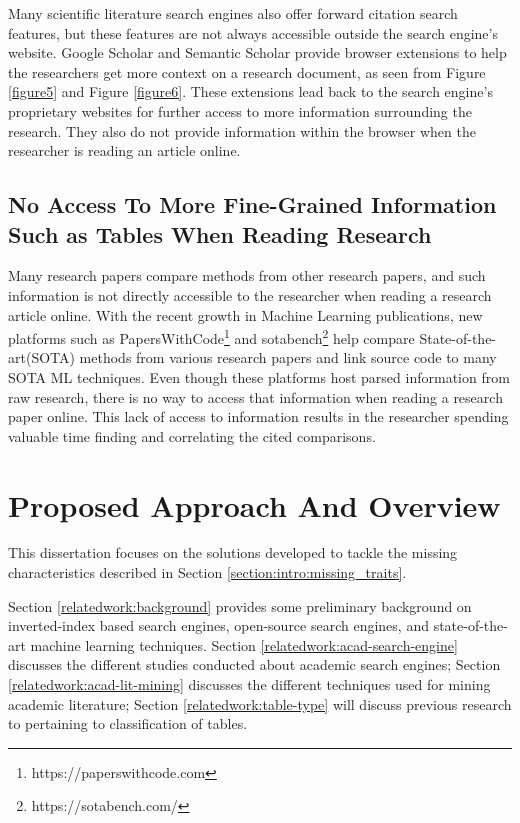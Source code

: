 Many scientific literature search engines also offer forward citation search features, but these features are not always accessible outside the search engine’s website. 
Google Scholar and Semantic Scholar provide browser extensions to help the researchers get more context on a research document, as seen from Figure \ref{figure5} and Figure \ref{figure6}. 
These extensions lead back to the search engine's proprietary websites for further access to more information surrounding the research. They also do not provide information within the browser when the researcher is reading an article online. 
\pagebreak
\subsection{No Access To More Fine-Grained Information Such as Tables When Reading Research}

Many research papers compare methods from other research papers, and such information is not directly accessible to the researcher when reading a research article online. With the recent growth in Machine Learning publications, new platforms such as PapersWithCode\footnote{https://paperswithcode.com} and sotabench\footnote{https://sotabench.com/} help compare State-of-the-art(SOTA) methods from various research papers and link source code to many SOTA ML techniques. Even though these platforms host parsed information from raw research, there is no way to access that information when reading a research paper online. This lack of access to information results in the researcher spending valuable time finding and correlating the cited comparisons.

\section{Proposed Approach And Overview}
This dissertation focuses on the solutions developed to tackle the missing characteristics described in Section \ref{section:intro:missing_traits}. 

Section \ref{relatedwork:background} provides some preliminary background on inverted-index based search engines, open-source search engines, and state-of-the-art machine learning techniques.
Section \ref{relatedwork:acad-search-engine} discusses the different studies conducted about academic search engines; Section \ref{relatedwork:acad-lit-mining} discusses the different techniques used for mining academic literature; Section \ref{relatedwork:table-type} will discuss previous research to pertaining to classification of tables. 


